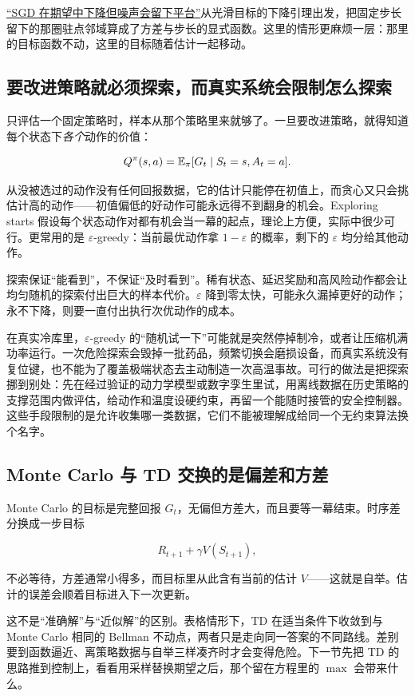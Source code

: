 \hyperref[sec:09-Convex-Optimization/08-Nonconvex-and-Stochastic-Optimization/04]{``SGD 在期望中下降但噪声会留下平台''}从光滑目标的下降引理出发，把固定步长留下的那圈驻点邻域算成了方差与步长的显式函数。这里的情形更麻烦一层：那里的目标函数不动，这里的目标随着估计一起移动。

\subsection{要改进策略就必须探索，而真实系统会限制怎么探索}

只评估一个固定策略时，样本从那个策略里来就够了。一旦要改进策略，就得知道每个状态下\emph{各个}动作的价值：

\[
Q^\pi(s,a)=\mathbb{E}_\pi[G_t\mid S_t=s,A_t=a].
\]

从没被选过的动作没有任何回报数据，它的估计只能停在初值上，而贪心又只会挑估计高的动作——初值偏低的好动作可能永远得不到翻身的机会。Exploring starts 假设每个状态动作对都有机会当一幕的起点，理论上方便，实际中很少可行。更常用的是 \(\varepsilon\)-greedy：当前最优动作拿 \(1-\varepsilon\) 的概率，剩下的 \(\varepsilon\) 均分给其他动作。

探索保证``能看到''，不保证``及时看到''。稀有状态、延迟奖励和高风险动作都会让均匀随机的探索付出巨大的样本代价。\(\varepsilon\) 降到零太快，可能永久漏掉更好的动作；永不下降，则要一直付出执行次优动作的成本。

在真实冷库里，\(\varepsilon\)-greedy 的``随机试一下''可能就是突然停掉制冷，或者让压缩机满功率运行。一次危险探索会毁掉一批药品，频繁切换会磨损设备，而真实系统没有复位键，也不能为了覆盖极端状态去主动制造一次高温事故。可行的做法是把探索挪到别处：先在经过验证的动力学模型或数字孪生里试，用离线数据在历史策略的支撑范围内做评估，给动作和温度设硬约束，再留一个能随时接管的安全控制器。这些手段限制的是允许收集哪一类数据，它们不能被理解成给同一个无约束算法换个名字。

\subsection{Monte Carlo 与 TD 交换的是偏差和方差}

Monte Carlo 的目标是完整回报 \(G_t\)，无偏但方差大，而且要等一幕结束。时序差分换成一步目标

\[
R_{t+1}+\gamma V(S_{t+1}),
\]

不必等待，方差通常小得多，而目标里从此含有当前的估计 \(V\)——这就是自举。估计的误差会顺着目标进入下一次更新。

这不是``准确解''与``近似解''的区别。表格情形下，TD 在适当条件下收敛到与 Monte Carlo 相同的 Bellman 不动点，两者只是走向同一答案的不同路线。差别要到函数逼近、离策略数据与自举三样凑齐时才会变得危险。下一节先把 TD 的思路推到控制上，看看用采样替换期望之后，那个留在方程里的 \(\max\) 会带来什么。
